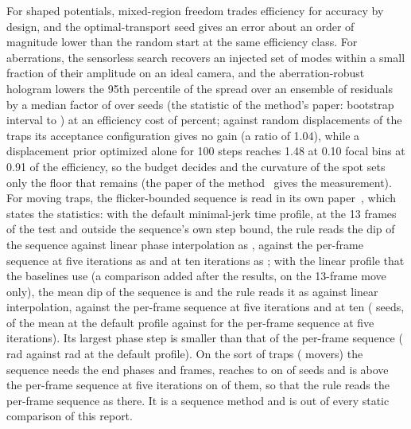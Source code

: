 For shaped potentials, mixed-region freedom trades efficiency for accuracy by design, and the optimal-transport seed gives an error about an order of magnitude lower than the random start at the same efficiency class. For aberrations, the sensorless search recovers an injected set of modes within a small fraction of their amplitude on an ideal camera, and the aberration-robust hologram lowers the 95th percentile of the spread over an ensemble of residuals by a median factor of  over  seeds (the statistic of the method's paper: bootstrap interval  to ) at an efficiency cost of \accBFourEffDrop{} percent; against random displacements of the traps its acceptance configuration gives no gain (a ratio of 1.04), while a displacement prior optimized alone for 100 steps reaches 1.48 at 0.10 focal bins at 0.91 of the efficiency, so the budget decides and the curvature of the spot sets only the floor that remains (the paper of the method~\cite{aberpaper} gives the measurement). For moving traps, the flicker-bounded sequence is read in its own paper~\cite{flickerpaper}, which states the statistics: with the default minimal-jerk time profile, at the 13 frames of the test and outside the sequence's own step bound, the rule reads the dip of the sequence against linear phase interpolation as , against the per-frame sequence at five iterations as  and at ten iterations as ; with the linear profile that the baselines use (a comparison added after the results, on the 13-frame move only), the mean dip of the sequence is  and the rule reads it as  against linear interpolation,  against the per-frame sequence at five iterations and  at ten ( seeds,  of the mean at the default profile against  for the per-frame sequence at five iterations). Its largest phase step is smaller than that of the per-frame sequence ( rad against  rad at the default profile). On the sort of  traps ( movers) the sequence needs the end phases and  frames, reaches  to  on  of  seeds and is above the per-frame sequence at five iterations on  of them, so that the rule reads the per-frame sequence as  there. It is a sequence method and is out of every static comparison of this report.

